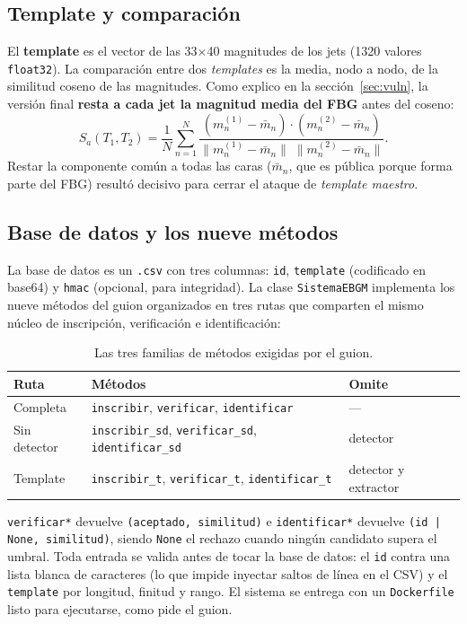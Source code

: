 \documentclass[11pt,a4paper]{article}
\begin{document}
\subsection{Template y comparación}

El \textbf{template} es el vector de las 33$\times$40 magnitudes de los jets
(1320 valores \texttt{float32}). La comparación entre dos \emph{templates} es la media, nodo a
nodo, de la similitud coseno de las magnitudes. Como explico en la
sección~\ref{sec:vuln}, la versión final \textbf{resta a cada jet la magnitud media del FBG}
antes del coseno:
\[
S_a(T_1,T_2) = \frac{1}{N}\sum_{n=1}^{N}
\frac{(m^{(1)}_n-\bar m_n)\cdot(m^{(2)}_n-\bar m_n)}
{\lVert m^{(1)}_n-\bar m_n\rVert\;\lVert m^{(2)}_n-\bar m_n\rVert}.
\]
Restar la componente común a todas las caras ($\bar m_n$, que es pública porque forma parte
del FBG) resultó decisivo para cerrar el ataque de \emph{template maestro}.

\subsection{Base de datos y los nueve métodos}

La base de datos es un \texttt{.csv} con tres columnas: \texttt{id}, \texttt{template}
(codificado en base64) y \texttt{hmac} (opcional, para integridad). La clase
\texttt{SistemaEBGM} implementa los nueve métodos del guion organizados en tres rutas que
comparten el mismo núcleo de inscripción, verificación e identificación:

\begin{table}[h]
\centering
\small
\begin{tabular}{@{}lll@{}}
\toprule
\textbf{Ruta} & \textbf{Métodos} & \textbf{Omite} \\
\midrule
Completa & \texttt{inscribir}, \texttt{verificar}, \texttt{identificar} & --- \\
Sin detector & \texttt{inscribir\_sd}, \texttt{verificar\_sd}, \texttt{identificar\_sd} & detector \\
Template & \texttt{inscribir\_t}, \texttt{verificar\_t}, \texttt{identificar\_t} & detector y extractor \\
\bottomrule
\end{tabular}
\caption{Las tres familias de métodos exigidas por el guion.}
\end{table}

\texttt{verificar*} devuelve \texttt{(aceptado, similitud)} e \texttt{identificar*} devuelve
\texttt{(id | None, similitud)}, siendo \texttt{None} el rechazo cuando ningún candidato supera
el umbral. Toda entrada se valida antes de tocar la base de datos: el \texttt{id} contra una
lista blanca de caracteres (lo que impide inyectar saltos de línea en el CSV) y el
\texttt{template} por longitud, finitud y rango. El sistema se entrega con un \texttt{Dockerfile}
listo para ejecutarse, como pide el guion.
\end{document}
